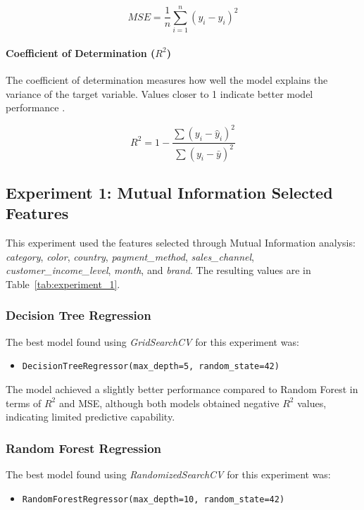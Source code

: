 \documentclass[12pt]{article}
\begin{document}
\[
MSE = \frac{1}{n}\sum_{i=1}^{n}(y_i - \hat{y}_i)^2
\]

\paragraph{Coefficient of Determination ($R^2$)}

The coefficient of determination measures how well the model explains the variance of the target variable. Values closer to 1 indicate better model performance \cite{metrics_medium}.

\[
R^2 = 1 - \frac{\sum (y_i - \hat{y}_i)^2}{\sum (y_i - \bar{y})^2}
\]

\subsection{Experiment 1: Mutual Information Selected Features}

This experiment used the features selected through Mutual Information analysis: \textit{category}, \textit{color}, \textit{country}, \textit{payment\_method}, \textit{sales\_channel}, \textit{customer\_income\_level}, \textit{month}, and \textit{brand}. The resulting values are in Table~\ref{tab:experiment_1}.

\subsubsection{Decision Tree Regression}

The best model found using \textit{GridSearchCV} for this experiment was:

\begin{itemize}
    \item \texttt{DecisionTreeRegressor(max\_depth=5, random\_state=42)}
\end{itemize}

The model achieved a slightly better performance compared to Random Forest in terms of $R^2$ and MSE, although both models obtained negative $R^2$ values, indicating limited predictive capability.

\subsubsection{Random Forest Regression}

The best model found using \textit{RandomizedSearchCV} for this experiment was:

\begin{itemize}
    \item \texttt{RandomForestRegressor(max\_depth=10, random\_state=42)}
\end{itemize}
\end{document}
